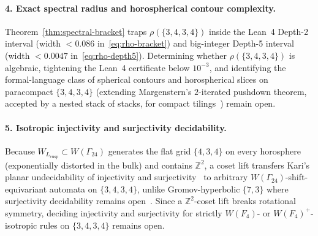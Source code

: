 \paragraph{4. Exact spectral radius and horospherical contour complexity.}
Theorem~\ref{thm:spectral-bracket} traps $\rho(\{3,4,3,4\})$ inside the Lean~4 Depth-2 interval (width $< 0.086$ in~\eqref{eq:rho-bracket}) and big-integer Depth-5 interval (width $< 0.0047$ in~\eqref{eq:rho-depth5}). Determining whether $\rho(\{3,4,3,4\})$ is algebraic, tightening the Lean~4 certificate below $10^{-3}$, and identifying the formal-language class of spherical contours and horospherical slices on paracompact $\{3,4,3,4\}$ (extending Margenstern's $2$-iterated pushdown theorem, accepted by a nested stack of stacks, for compact tilings~\cite{margenstern2009contour}) remain open.

\paragraph{5. Isotropic injectivity and surjectivity decidability.}
Because $W_{L_{\mathrm{cusp}}} \subset W(\Gamma_{24})$ generates the flat grid $\{4,3,4\}$ on every horosphere (exponentially distorted in the bulk) and contains $\mathbb{Z}^2$, a coset lift transfers Kari's planar undecidability of injectivity and surjectivity~\cite{kari1994} to arbitrary $W(\Gamma_{24})$-shift-equivariant automata on $\{3,4,3,4\}$, unlike Gromov-hyperbolic $\{7,3\}$ where surjectivity decidability remains open~\cite{margenstern2008injectivity}. Since a $\mathbb{Z}^2$-coset lift breaks rotational symmetry, deciding injectivity and surjectivity for strictly $W(F_4)$- or $W(F_4)^+$-isotropic rules on $\{3,4,3,4\}$ remains open.

